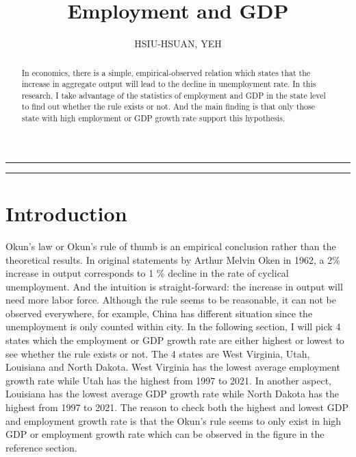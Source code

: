 \documentclass{article}
\title{Employment and GDP}
\author{HSIU-HSUAN, YEH}
\begin{document}
\pagestyle{headings}	
\maketitle
\noindent\rule{12cm}{0.5pt}
\begin{abstract}
    In economics, there is a simple, empirical-observed relation which states 
    that the increase
    in aggregate output will lead to the decline in unemployment rate. In this 
    research, I take advantage of the statistics of employment and GDP in the 
    state level to find out whether the rule exists or not. And the main finding
    is that only those state with high employment or GDP growth rate support this
    hypothesis.
\end{abstract}
\noindent\rule{12cm}{0.5pt}
\section{Introduction}
Okun's law or Okun's rule of thumb is an empirical conclusion rather than the
theoretical results. In original statements by Arthur Melvin Oken in 1962, a
 2\% increase in output corresponds to 1 \% decline in the rate
of cyclical unemployment. And the intuition is straight-forward: the increase in 
output will need more labor force. Although the rule seems to be reasonable, 
it can not be observed everywhere, for example, China
has different situation since the unemployment is only counted within city.
In the following section, I will pick 4 states which the employment or GDP growth
rate are either highest or lowest to see whether the rule exists or not. The 4 states are West Virginia, Utah, Louisiana
and North Dakota. West Virginia has the lowest average employment growth rate while
Utah has the highest from 1997 to 2021. In another aspect, Louisiana has the 
lowest average GDP growth rate while North Dakota has the highest from 1997 to 
2021. The reason to check both the highest and lowest GDP and employment growth
rate is that the Okun's rule seems to only exist in high GDP or employment growth rate which
can be observed in the figure in the reference section.
\end{document}
